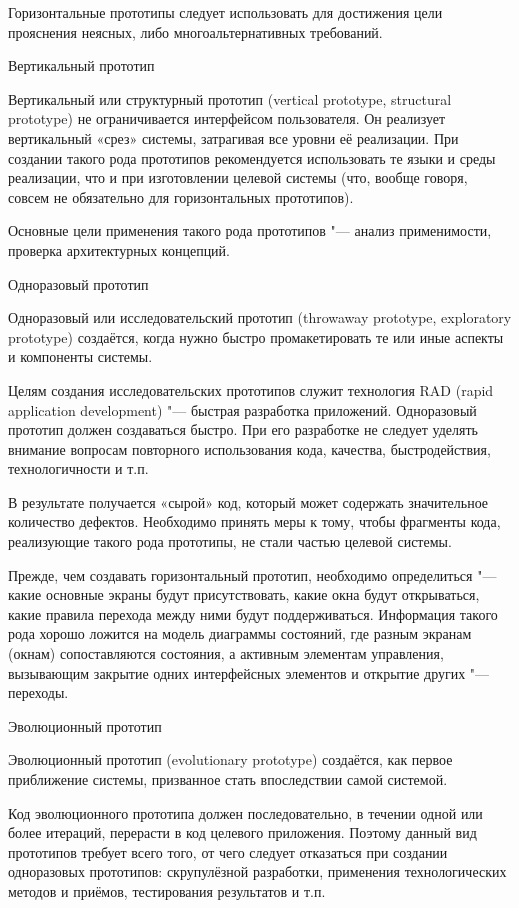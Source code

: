 \documentclass{../industrial-development}
\begin{document}
{Горизонтальные прототипы следует использовать для достижения цели прояснения неясных, либо многоальтернативных требований.

\alert{Вертикальный прототип}

Вертикальный или структурный прототип (vertical prototype, structural prototype) не ограничивается интерфейсом пользователя. Он реализует вертикальный «срез» системы, затрагивая все уровни её реализации. При создании такого рода прототипов рекомендуется использовать те языки и среды реализации, что и при изготовлении целевой системы (что, вообще говоря, совсем не обязательно для горизонтальных прототипов).

Основные цели применения такого рода прототипов "--- анализ применимости, проверка архитектурных концепций.

\alert{Одноразовый прототип}

Одноразовый или исследовательский прототип (throwaway prototype, exploratory prototype) создаётся, когда нужно быстро промакетировать те или иные аспекты и компоненты системы.

Целям создания исследовательских прототипов служит технология RAD (rapid application development) "--- быстрая разработка приложений. Одноразовый прототип должен создаваться быстро. При его разработке не следует уделять внимание вопросам повторного использования кода, качества, быстродействия, технологичности и т.п.

В результате получается «сырой» код, который может содержать значительное количество дефектов. Необходимо принять меры к тому, чтобы фрагменты кода, реализующие такого рода прототипы, не стали частью целевой системы.

Прежде, чем создавать горизонтальный прототип, необходимо определиться "--- какие основные экраны будут присутствовать, какие окна
будут открываться, какие правила перехода между ними будут поддерживаться. Информация такого рода хорошо ложится на модель диаграммы состояний, где разным экранам (окнам) сопоставляются состояния, а активным элементам управления, вызывающим закрытие одних интерфейсных элементов и открытие других "--- переходы.

\alert{Эволюционный прототип}

Эволюционный прототип (evolutionary prototype) создаётся, как первое приближение системы, призванное стать впоследствии самой системой.

Код эволюционного прототипа должен последовательно, в течении одной или более итераций, перерасти в код целевого приложения. Поэтому данный вид прототипов требует всего того, от чего следует отказаться при создании одноразовых прототипов: скрупулёзной разработки, применения технологических методов и приёмов, тестирования результатов и т.п.

}
\end{document}
